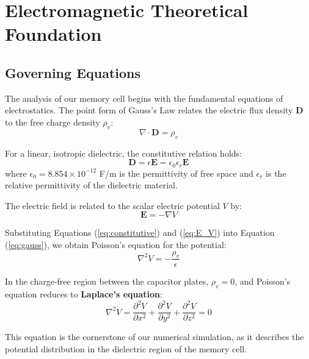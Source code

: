 \documentclass[12pt,a4paper]{report}
\begin{document}
\chapter{Electromagnetic Theoretical Foundation}
\label{ch:theory}

\section{Governing Equations}

The analysis of our memory cell begins with the fundamental equations of electrostatics. The point form of Gauss's Law relates the electric flux density $\mathbf{D}$ to the free charge density $\rho_v$:
\begin{equation}
    \nabla \cdot \mathbf{D} = \rho_v
    \label{eq:gauss}
\end{equation}

For a linear, isotropic dielectric, the constitutive relation holds:
\begin{equation}
    \mathbf{D} = \epsilon \mathbf{E} = \epsilon_0 \epsilon_r \mathbf{E}
    \label{eq:constitutive}
\end{equation}
where $\epsilon_0 = 8.854 \times 10^{-12}$ F/m is the permittivity of free space and $\epsilon_r$ is the relative permittivity of the dielectric material.

The electric field is related to the scalar electric potential $V$ by:
\begin{equation}
    \mathbf{E} = -\nabla V
    \label{eq:E_V}
\end{equation}

Substituting Equations (\ref{eq:constitutive}) and (\ref{eq:E_V}) into Equation (\ref{eq:gauss}), we obtain Poisson's equation for the potential:
\begin{equation}
    \nabla^2 V = -\frac{\rho_v}{\epsilon}
    \label{eq:poisson}
\end{equation}

In the charge-free region between the capacitor plates, $\rho_v = 0$, and Poisson's equation reduces to \textbf{Laplace's equation}:
\begin{equation}
    \nabla^2 V = \frac{\partial^2 V}{\partial x^2} + \frac{\partial^2 V}{\partial y^2} + \frac{\partial^2 V}{\partial z^2} = 0
    \label{eq:laplace}
\end{equation}

This equation is the cornerstone of our numerical simulation, as it describes the potential distribution in the dielectric region of the memory cell.
\end{document}
